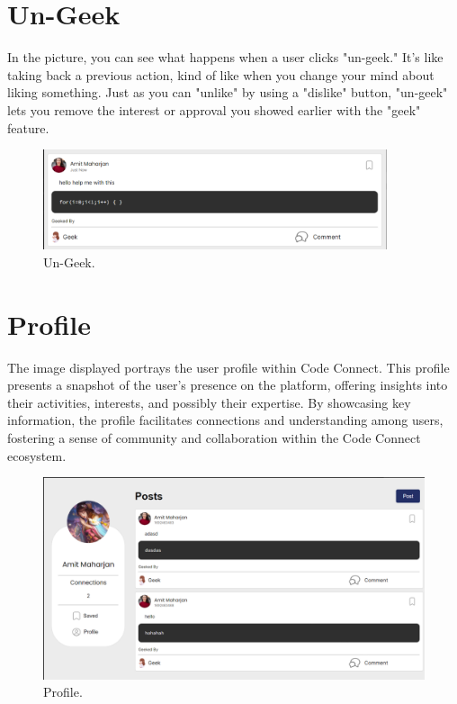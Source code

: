 \section{Un-Geek}
In the picture, you can see what happens when a user clicks "un-geek." It's like taking back a previous action, kind of like when you change your mind about liking something. Just as you can "unlike" by using a "dislike" button, "un-geek" lets you remove the interest or approval you showed earlier with the "geek" feature.
\begin{figure}[H]
    \centering
    \includegraphics[width=0.9\textwidth]{Outcome-ss/ungeek.png}
    \caption{Un-Geek.}
    \label{fig:Un-Geek}
\end{figure}

\section{Profile}
The image displayed portrays the user profile within Code Connect. This profile presents a snapshot of the user's presence on the platform, offering insights into their activities, interests, and possibly their expertise. By showcasing key information, the profile facilitates connections and understanding among users, fostering a sense of community and collaboration within the Code Connect ecosystem.
\begin{figure}[ht]
    \centering
    \includegraphics[width=1\textwidth]{Outcome-ss/self-profile.png}
    \caption{Profile.}
    \label{fig:Profile}
\end{figure}
\newpage
